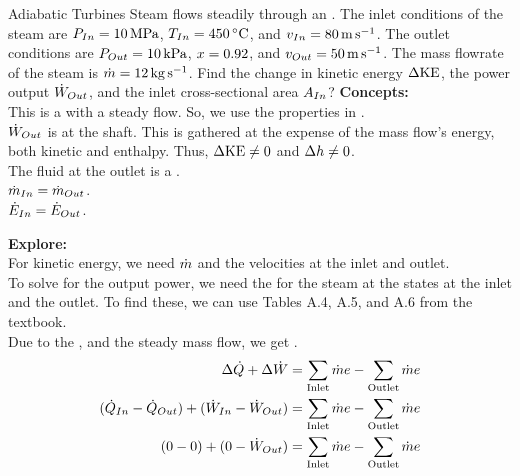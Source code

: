 \begin{example}{Adiabatic Turbines}
  Steam flows steadily through an  .
  The inlet conditions of the steam are $P_{In} = \SI{10}{\mega\pascal}$, $\Temp_{In} = \SI{450}{\degreeCelsius}$, and $v_{In} = \SI{80}{\meter\per\second}$.
  The outlet conditions are $P_{Out} = \SI{10}{\kilo\pascal}$, $x = 0.92$, and $v_{Out} = \SI{50}{\meter\per\second}$.
  The mass flowrate of the steam is $\dot{m} = \SI{12}{\kilo\gram\per\second}$.
  Find the change in kinetic energy $\Delta \mathrm{KE}$, the power output $\dot{W}_{Out}$, and the inlet cross-sectional area $A_{In}$?
  \tcblower{}
  \textbf{Concepts:} \\
  This is a  with a steady flow.
  So, we use the properties in . \\
  $\dot{W}_{Out}$ is at the shaft.
  This is gathered at the expense of the mass flow's energy, both kinetic and enthalpy.
  Thus, $\Delta \mathrm{KE} \neq 0$ and $\Delta h \neq 0$. \\
  The fluid at the outlet is a . \\
  $\dot{m}_{In} = \dot{m}_{Out}$. \\
  $\dot{E}_{In} = \dot{E}_{Out}$.

  \textbf{Explore:} \\
  For kinetic energy, we need $\dot{m}$ and the velocities at the inlet and outlet. \\
  To solve for the output power, we need the  for the steam at the states at the inlet and the outlet.
  To find these, we can use Tables A.4, A.5, and A.6 from the textbook. \\
  Due to the , and the steady mass flow, we get .
  \begin{align*}
    \Delta \dot{Q} + \Delta \dot{W} &= \sum\limits_{\text{Inlet}} \dot{m} e - \sum\limits_{\text{Outlet}} \dot{m} e \\
    (\dot{Q}_{In} - \dot{Q}_{Out}) + (\dot{W}_{In} - \dot{W}_{Out}) &= \sum\limits_{\text{Inlet}} \dot{m} e - \sum\limits_{\text{Outlet}} \dot{m} e \\
    (0 - 0) + (0 - \dot{W}_{Out}) &= \sum\limits_{\text{Inlet}} \dot{m} e - \sum\limits_{\text{Outlet}} \dot{m} e \\
  \end{align*}


\end{example}

